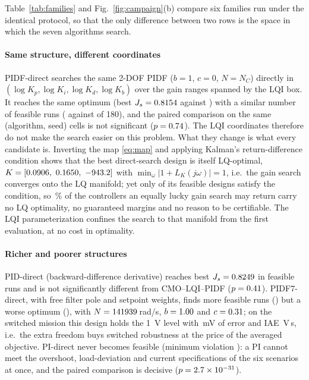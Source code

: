 Table~\ref{tab:families} and Fig.~\ref{fig:campaign}(b) compare six families
run under the identical protocol, so that the only difference between two rows
is the space in which the seven algorithms search.

\paragraph{Same structure, different coordinates} PIDF-direct searches the
same 2-DOF PIDF ($b=1$, $c=0$, $N=N_C$) directly in
$(\log K_p,\log K_i,\log K_d,\log K_b)$ over the gain ranges spanned by the LQI
box. It reaches the same optimum (best $J_s=0.8154$ against \CMObest{}) with
a similar number of feasible runs (\FeasPIDF{} against \CMOfeas{} of 180), and
the paired comparison on the same (algorithm, seed) cells is not significant
($p=0.74$). The LQI coordinates therefore do not make the search easier
on this problem. What they change is what every candidate is. Inverting the map
\eqref{eq:map} and applying Kalman's return-difference condition shows that the
best direct-search design is itself LQ-optimal, $K=[0.0906,\ 0.1650,\ -943.2]$ with
$\min_\omega|1+L_K(j\omega)|=1$, i.e.\ the gain search converges onto the LQ
manifold; yet only \IOk{} of its \IOn{} feasible designs satisfy the condition,
so \IOpct\,\% of the controllers an equally lucky gain search may return carry
no LQ optimality, no guaranteed margins and no reason to be certifiable. The
LQI parameterization confines the search to that manifold from the first
evaluation, at no cost in optimality.

\paragraph{Richer and poorer structures} PID-direct (backward-difference
derivative) reaches best $J_s=0.8249$ in \FeasPID{} feasible runs and is not
significantly different from CMO--LQI--PIDF ($p=0.41$). PIDF7-direct, with
free filter pole and setpoint weights, finds more feasible runs (\FeasPIDFs)
but a worse optimum (\BestPIDFs), with $N=141939$\,rad/s, $b=1.00$ and
$c=0.31$; on the switched mission this design holds the \SI{1}{V} level
with \SwPIDFsEss{}\,mV of error and IAE \SwPIDFsIAE{}\,V\,s, i.e.\ the extra
freedom buys switched robustness at the price of the averaged objective. PI-direct never becomes feasible (minimum
violation \ViolPI{}): a PI cannot meet the overshoot, load-deviation and
current specifications of the six scenarios at once, and the paired comparison
is decisive ($p=2.7\times10^{-31}$).

